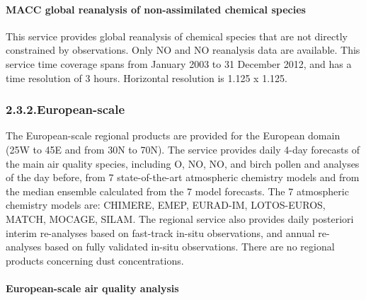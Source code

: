 \documentclass[9pt]{report}
\begin{document}
\paragraph{MACC global reanalysis of non-assimilated chemical species}\label{sec-macc-global-reanalysis-of-non-assimilated-chemical-species}%

\noindent{}\mdbr
{}This service provides global reanalysis of chemical species that are not directly constrained by observations.
Only NO and NO reanalysis data are available.
This service time coverage spans from January 2003 to 31 December 2012, and has a time resolution of 3 hours.
Horizontal resolution is 1.125\textdegree{} x 1.125\textdegree{}.%

\subsubsection{2.3.2.\hspace*{0.5em}European-scale}\label{sec-european-scale}%

\noindent{}The European-scale regional products are provided for the European domain (25\textdegree{}W to 45\textdegree{}E and from 30\textdegree{}N to 70\textdegree{}N).
The service provides daily 4-day forecasts of the main air quality species, including O, NO, NO, and birch pollen and analyses of the day before, from 7 state-of-the-art atmospheric chemistry models and from the median ensemble calculated from the 7 model forecasts.
The 7 atmospheric chemistry models are: CHIMERE, EMEP, EURAD-IM, LOTOS-EUROS, MATCH, MOCAGE, SILAM.
The regional service also provides daily posteriori interim re-analyses based on fast-track in-situ observations, and annual re-analyses based on fully validated in-situ observations.
There are no regional products concerning dust concentrations.%

\paragraph{European-scale air quality analysis}\label{sec-european-scale-air-quality-analysis}%
\end{document}
